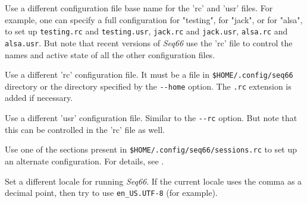       Use a different configuration file base name for the 'rc' and 'usr'
      files.  For example, one can specify a full configuration for "testing",
      for "jack", or for "alsa", to set up
      \texttt{testing.rc} and \texttt{testing.usr},
      \texttt{jack.rc} and \texttt{jack.usr},
      \texttt{alsa.rc} and \texttt{alsa.usr}.
      But note that recent versions of \textsl{Seq66} use the 'rc' file
      to control the names and active state of all the other configuration
      files.

      Use a different 'rc' configuration file.
      It must be a file in \texttt{\$HOME/.config/seq66}
      directory or the directory specified by the \texttt{-{}-home} option.
      The \texttt{.rc} extension is added if necessary.

      Use a different 'usr' configuration file.  Similar to the \texttt{-{}-rc}
      option. But note that this can be controlled in the 'rc' file as
      well.

      Use one of the sections present in
      \texttt{\$HOME/.config/seq66/sessions.rc}
      to set up an alternate configuration.
      For details, see .

      Set a different locale for running \textsl{Seq66}.
      If the current locale uses the comma as a decimal point,
      then try to use \texttt{en\_US.UTF-8} (for example).

